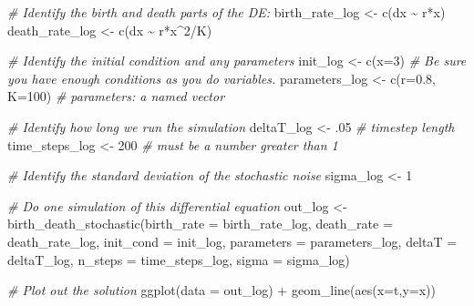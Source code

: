 \documentclass[
]{book}
\newenvironment{Shaded}{\begin{snugshade}}{\end{snugshade}}
\newcommand{\AttributeTok}[1]{\textcolor[rgb]{0.77,0.63,0.00}{#1}}
\newcommand{\CommentTok}[1]{\textcolor[rgb]{0.56,0.35,0.01}{\textit{#1}}}
\newcommand{\DecValTok}[1]{\textcolor[rgb]{0.00,0.00,0.81}{#1}}
\newcommand{\FloatTok}[1]{\textcolor[rgb]{0.00,0.00,0.81}{#1}}
\newcommand{\FunctionTok}[1]{\textcolor[rgb]{0.00,0.00,0.00}{#1}}
\newcommand{\NormalTok}[1]{#1}
\newcommand{\OtherTok}[1]{\textcolor[rgb]{0.56,0.35,0.01}{#1}}
\newcommand{\SpecialCharTok}[1]{\textcolor[rgb]{0.00,0.00,0.00}{#1}}
\theoremstyle{definition}
\theoremstyle{definition}
\theoremstyle{definition}
\theoremstyle{remark}
\begin{document}
\begin{Shaded}
\begin{Highlighting}[]
\CommentTok{\# Identify the birth and death parts of the DE:}
\NormalTok{birth\_rate\_log }\OtherTok{\textless{}{-}} \FunctionTok{c}\NormalTok{(dx }\SpecialCharTok{\textasciitilde{}}\NormalTok{ r}\SpecialCharTok{*}\NormalTok{x)}
\NormalTok{death\_rate\_log }\OtherTok{\textless{}{-}}  \FunctionTok{c}\NormalTok{(dx }\SpecialCharTok{\textasciitilde{}}\NormalTok{ r}\SpecialCharTok{*}\NormalTok{x}\SpecialCharTok{\^{}}\DecValTok{2}\SpecialCharTok{/}\NormalTok{K)}

\CommentTok{\# Identify the initial condition and any parameters}
\NormalTok{init\_log }\OtherTok{\textless{}{-}} \FunctionTok{c}\NormalTok{(}\AttributeTok{x=}\DecValTok{3}\NormalTok{)  }\CommentTok{\# Be sure you have enough conditions as you do variables. }
\NormalTok{parameters\_log }\OtherTok{\textless{}{-}} \FunctionTok{c}\NormalTok{(}\AttributeTok{r=}\FloatTok{0.8}\NormalTok{, }\AttributeTok{K=}\DecValTok{100}\NormalTok{)   }\CommentTok{\# parameters: a named vector}

\CommentTok{\# Identify how long we run the simulation}
\NormalTok{deltaT\_log }\OtherTok{\textless{}{-}}\NormalTok{ .}\DecValTok{05}    \CommentTok{\# timestep length}
\NormalTok{time\_steps\_log }\OtherTok{\textless{}{-}} \DecValTok{200}   \CommentTok{\# must be a number greater than 1}

\CommentTok{\# Identify the standard deviation of the stochastic noise}
\NormalTok{sigma\_log }\OtherTok{\textless{}{-}} \DecValTok{1}

\CommentTok{\# Do one simulation of this differential equation}
\NormalTok{out\_log }\OtherTok{\textless{}{-}} \FunctionTok{birth\_death\_stochastic}\NormalTok{(}\AttributeTok{birth\_rate =}\NormalTok{ birth\_rate\_log,}
                             \AttributeTok{death\_rate =}\NormalTok{ death\_rate\_log,}
                             \AttributeTok{init\_cond =}\NormalTok{ init\_log,}
                             \AttributeTok{parameters =}\NormalTok{ parameters\_log,}
                             \AttributeTok{deltaT =}\NormalTok{ deltaT\_log,}
                             \AttributeTok{n\_steps =}\NormalTok{ time\_steps\_log,}
                             \AttributeTok{sigma =}\NormalTok{ sigma\_log)}

\CommentTok{\# Plot out the solution}
\FunctionTok{ggplot}\NormalTok{(}\AttributeTok{data =}\NormalTok{ out\_log) }\SpecialCharTok{+}
  \FunctionTok{geom\_line}\NormalTok{(}\FunctionTok{aes}\NormalTok{(}\AttributeTok{x=}\NormalTok{t,}\AttributeTok{y=}\NormalTok{x))}
\end{Highlighting}
\end{Shaded}
\end{document}
